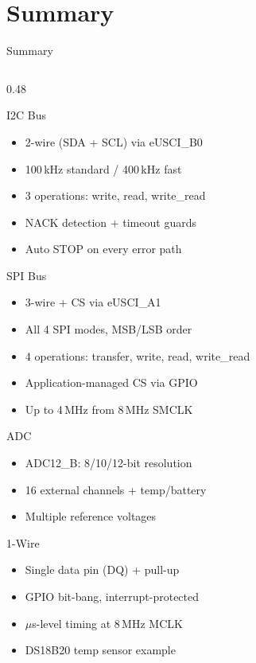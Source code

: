 \documentclass[aspectratio=169, 10pt]{beamer}
\begin{document}
\section{Summary}

\begin{frame}{Summary}
\begin{columns}[T]
\begin{column}{0.48\textwidth}
\begin{block}{I2C Bus}
\begin{itemize}
  \item 2-wire (SDA + SCL) via eUSCI\_B0
  \item 100\,kHz standard / 400\,kHz fast
  \item 3 operations: write, read, write\_read
  \item NACK detection + timeout guards
  \item Auto STOP on every error path
\end{itemize}
\end{block}

\begin{block}{SPI Bus}
\begin{itemize}
  \item 3-wire + CS via eUSCI\_A1
  \item All 4 SPI modes, MSB/LSB order
  \item 4 operations: transfer, write, read, write\_read
  \item Application-managed CS via GPIO
  \item Up to 4\,MHz from 8\,MHz SMCLK
\end{itemize}
\end{block}

\begin{block}{ADC}
\begin{itemize}
  \item ADC12\_B: 8/10/12-bit resolution
  \item 16 external channels + temp/battery
  \item Multiple reference voltages
\end{itemize}
\end{block}

\begin{block}{1-Wire}
\begin{itemize}
  \item Single data pin (DQ) + pull-up
  \item GPIO bit-bang, interrupt-protected
  \item $\mu$s-level timing at 8\,MHz MCLK
  \item DS18B20 temp sensor example
\end{itemize}
\end{block}
\end{column}


\end{columns}
\end{frame}
\end{document}
